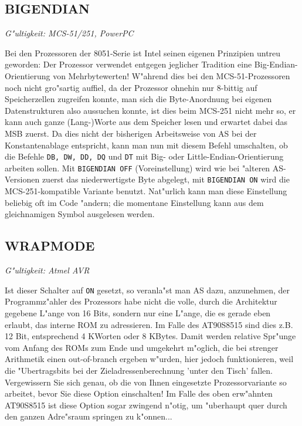 \documentclass[12pt,a4paper,twoside]{report}
\makeatletter
\newcommand{\tty}[1]{{\tt #1}}
\newcommand{\ttindex}[1]{\index{#1@{\tt #1}}}
\makeatother
\begin{document}
{%

\subsection{BIGENDIAN}
\ttindex{BIGENDIAN}

{\em G"ultigkeit: MCS-51/251, PowerPC}

Bei den Prozessoren der 8051-Serie ist Intel seinen eigenen Prinzipien 
untreu geworden: Der Prozessor verwendet entgegen jeglicher Tradition
eine Big-Endian-Orientierung von Mehrbytewerten!  W"ahrend dies bei 
den MCS-51-Prozessoren noch nicht gro"sartig auffiel, da der Prozessor 
ohnehin nur 8-bittig auf Speicherzellen zugreifen konnte, man sich die
Byte-Anordnung bei eigenen Datenstrukturen also aussuchen konnte, ist 
dies beim MCS-251 nicht mehr so, er kann auch ganze (Lang-)Worte aus 
dem Speicher lesen und erwartet dabei das MSB zuerst.  Da dies nicht der
bisherigen Arbeitsweise von AS bei der Konstantenablage entspricht, 
kann man nun mit diesem Befehl umschalten, ob die Befehle \tty{DB, DW, DD,
DQ} und \tty{DT} mit Big- oder Little-Endian-Orientierung arbeiten sollen.
Mit \tty{BIGENDIAN OFF} (Voreinstellung) wird wie bei "alteren AS-Versionen
zuerst das niederwertigste Byte abgelegt, mit \tty{BIGENDIAN ON} wird die
MCS-251-kompatible Variante benutzt.  Nat"urlich kann man diese Einstellung 
beliebig oft im Code "andern; die momentane Einstellung kann aus dem 
gleichnamigen Symbol ausgelesen werden.


\subsection{WRAPMODE}
\ttindex{WRAPMODE}

{\em G"ultigkeit: Atmel AVR}

Ist dieser Schalter auf {\tt ON} gesetzt, so veranla"st man AS dazu,
anzunehmen, der Programmz"ahler des Prozessors habe nicht die volle, durch
die Architektur gegebene L"ange von 16 Bits, sondern nur eine L"ange, die
es gerade eben erlaubt, das interne ROM zu adressieren.  Im Falle des
AT90S8515 sind dies z.B. 12 Bit, entsprechend 4 KWorten oder 8 KBytes. 
Damit werden relative Spr"unge vom Anfang des ROMs zum Ende und umgekehrt
m"oglich, die bei strenger Arithmetik einen out-of-branch ergeben w"urden,
hier jedoch funktionieren, weil die "Ubertragsbits bei der
Zieladressenberechnung 'unter den Tisch' fallen.  Vergewissern Sie sich
genau, ob die von Ihnen eingesetzte Prozessorvariante so arbeitet, bevor
Sie diese Option einschalten!  Im Falle des oben erw"ahnten AT90S8515 ist
diese Option sogar zwingend n"otig, um "uberhaupt quer durch den ganzen
Adre"sraum springen zu k"onnen...

}
\end{document}
